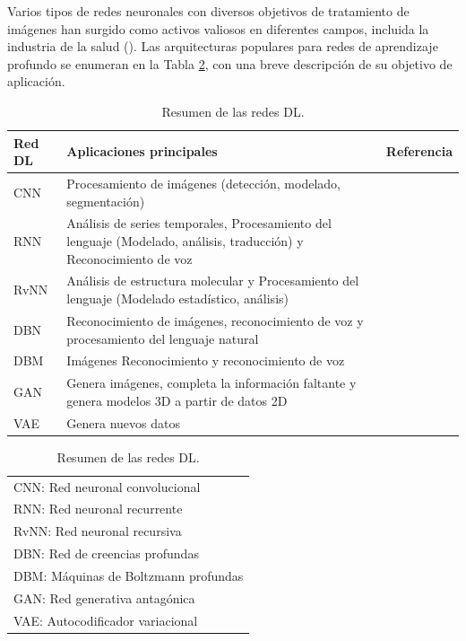 \documentclass[11pt,a4paper,openany]{article}
\begin{document}
    Varios tipos de redes neuronales con diversos objetivos de tratamiento de imágenes han surgido como activos valiosos en diferentes campos, incluida la industria de la salud (\cite{Shahid2019}). Las arquitecturas populares para redes de aprendizaje profundo se enumeran en la Tabla \ref{tab:DLN}, con una breve descripción de su objetivo de aplicación.\\

    \begin{table}[H]
        \caption{Resumen de las redes DL.\label{tab:DLN}}
        \begin{tabular}{l p{8cm} l}
        \hline
        \bf{Red DL} & \bf{Aplicaciones principales} & \bf{Referencia} \\
        \hline
        CNN & Procesamiento de imágenes (detección, modelado, segmentación) & \cite{Lecun1989} \\
        \hline
        RNN & Análisis de series temporales, Procesamiento del lenguaje (Modelado, análisis, traducción) y Reconocimiento de voz & \cite{Cho2014} \\
        \hline
        RvNN & Análisis de estructura molecular y Procesamiento del lenguaje (Modelado estadístico, análisis) & \cite{Goller1996} \\
        \hline
        DBN & Reconocimiento de imágenes, reconocimiento de voz y procesamiento del lenguaje natural & \cite{Hinton2009} \\
        \hline
        DBM & Imágenes Reconocimiento y reconocimiento de voz & \cite{Salakhutdinov2009} \\
        \hline
        GAN & Genera imágenes, completa la información faltante y genera modelos 3D a partir de datos 2D & \cite{Goodfellow2014} \\
        \hline
        VAE & Genera nuevos datos & \cite{kingma2013,Singh2021} \\
        \hline
        \end{tabular}
        \begin{tabular}{l}
        \footnotesize CNN: Red neuronal convolucional \\
        \footnotesize RNN: Red neuronal recurrente \\
        \footnotesize RvNN: Red neuronal recursiva \\
        \footnotesize DBN: Red de creencias profundas \\
        \footnotesize DBM: Máquinas de Boltzmann profundas \\
        \footnotesize GAN: Red generativa antagónica \\
        \footnotesize VAE: Autocodificador variacional \\
        \end{tabular}
    \end{table}
    
\end{document}

